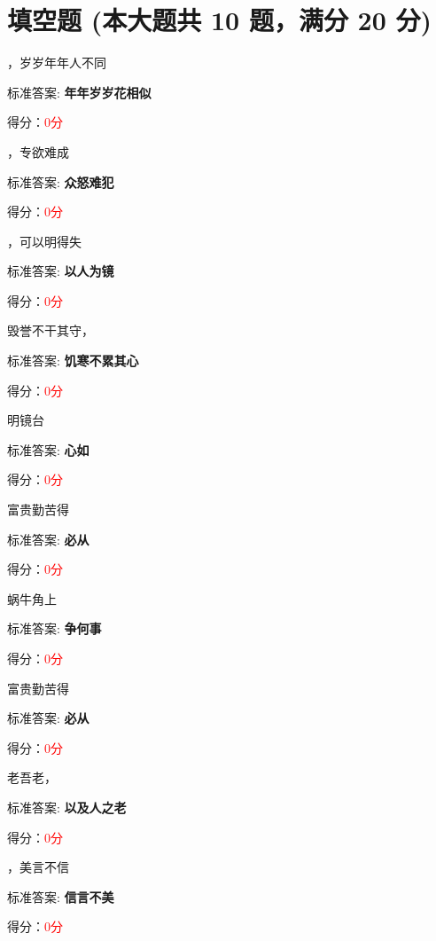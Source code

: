 \documentclass[12pt, a4paper, addpoints, answers]{exam}
\begin{document}
\section{\normalsize{填空题 (本大题共 10 题，满分 20 分)}}
\hspace{1.5cm}
\begin{multicols}{2}
\begin{questions}
\question[2] \fillin ，岁岁年年人不同

标准答案: \textbf{年年岁岁花相似}   

得分：\textcolor{red}{0分} 

\question[2] \fillin ，专欲难成

标准答案: \textbf{众怒难犯}   

得分：\textcolor{red}{0分} 

\question[2] \fillin ，可以明得失

标准答案: \textbf{以人为镜}   

得分：\textcolor{red}{0分} 

\question[2] 毁誉不干其守，\fillin 

标准答案: \textbf{饥寒不累其心}   

得分：\textcolor{red}{0分} 

\question[2] \fillin 明镜台

标准答案: \textbf{心如}   

得分：\textcolor{red}{0分} 

\question[2] 富贵\fillin 勤苦得

标准答案: \textbf{必从}   

得分：\textcolor{red}{0分} 

\question[2] 蜗牛角上\fillin 

标准答案: \textbf{争何事}   

得分：\textcolor{red}{0分} 

\question[2] 富贵\fillin 勤苦得

标准答案: \textbf{必从}   

得分：\textcolor{red}{0分} 

\question[2] 老吾老，\fillin 

标准答案: \textbf{以及人之老}   

得分：\textcolor{red}{0分} 

\question[2] \fillin ，美言不信

标准答案: \textbf{信言不美}   

得分：\textcolor{red}{0分} 
\end{questions}
\end{multicols}
\end{document}

